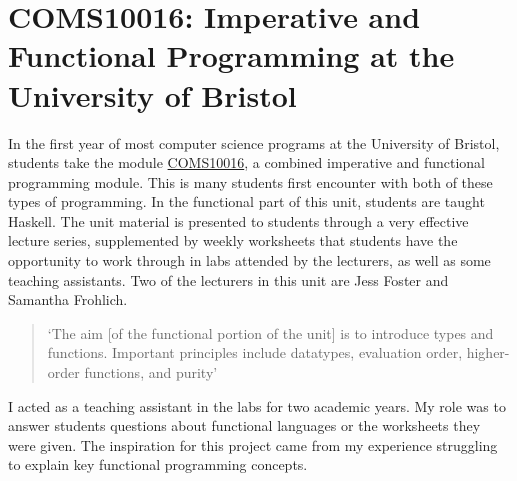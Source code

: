 
\section{COMS10016: Imperative and Functional Programming at the University of Bristol}
\label{COMS10016}
In the first year of most computer science programs at the University of Bristol, students take the module \href{https://www.bristol.ac.uk/unit-programme-catalogue/UnitDetails.jsa?unitCode=COMS10016}{COMS10016}, a combined imperative and functional programming module. This is many students first encounter with both of these types of programming. In the functional part of this unit, students are taught Haskell. The unit material is presented to students through a very effective lecture series, supplemented by weekly worksheets that students have the opportunity to work through in labs attended by the lecturers, as well as some teaching assistants. Two of the lecturers in this unit are Jess Foster and Samantha Frohlich. 

\begin{quote}
`The aim [of the functional portion of the unit] is to introduce types and functions. Important principles include datatypes, evaluation order, higher-order functions, and purity' \cite{COMS10016}
\end{quote}

\noindent I acted as a teaching assistant in the labs for two academic years. My role was to answer students questions about functional languages or the worksheets they were given. The inspiration for this project came from my experience struggling to explain key functional programming concepts. 
